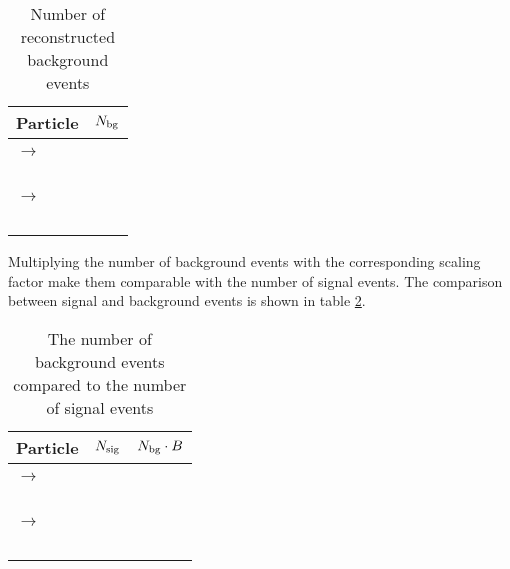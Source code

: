 \begin{table}
	\centering
	\caption{Number of reconstructed background events}
	\label{tab:bg_reco_without_scaling}
	\begin{tabular}{lc}
		\hline
		Particle & $N_{\textnormal{bg}}$ \\
		\hline
		\hline
		&\\
		\pbarpSystem $\rightarrow$ \excitedcascade \anticascade &\\
		\lam & \\
		\alam & \\
		\anticascade & \\
		\excitedcascade & \\
		\excitedcascade \anticascade & \\
		\hline
		\pbarpSystem $\rightarrow$ \cascade \excitedanticascade & \\
		\lam & \\
		\alam & \\
		\cascade & \\
		\excitedanticascade & \\
		\excitedanticascade \cascade &\\
		\hline
		  
	\end{tabular}
\end{table}
Multiplying the number of background events with the corresponding scaling factor make them comparable with the number of signal events.
The comparison between signal and background events is shown in table \ref{bg_compared_reco_with_scaling}.

\begin{table}
	\centering
	\caption{\propose The number of background events compared to the number of signal events}
	\label{bg_compared_reco_with_scaling}
	\begin{tabular}{lcc}
		\hline
		Particle & $N_{\textnormal{sig}}$ & $N_{\textnormal{bg}} \cdot B$ \\
		\hline
		\hline
		& &\\
		\pbarpSystem $\rightarrow$ \excitedcascade \anticascade & &\\
		\lam & & \\
		\alam & & \\
		\anticascade & & \\
		\excitedcascade & & \\
		\excitedcascade \anticascade & & \\
		\hline
		\pbarpSystem $\rightarrow$ \cascade \excitedanticascade & & \\
		\lam & & \\
		\alam & & \\
		\cascade & & \\
		\excitedanticascade & & \\
		\excitedanticascade \cascade & &\\
		\hline
		  
	\end{tabular}
\end{table}
	